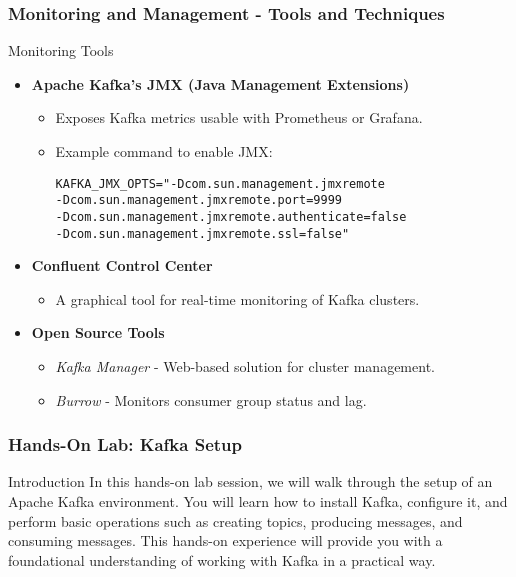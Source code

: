 \documentclass[aspectratio=169]{beamer}
\begin{document}
\begin{frame}[fragile]
  \frametitle{Monitoring and Management - Tools and Techniques}
  \begin{block}{Monitoring Tools}
    \begin{itemize}
      \item \textbf{Apache Kafka's JMX (Java Management Extensions)}
        \begin{itemize}
          \item Exposes Kafka metrics usable with Prometheus or Grafana.
          \item Example command to enable JMX:
          \begin{lstlisting}
KAFKA_JMX_OPTS="-Dcom.sun.management.jmxremote 
-Dcom.sun.management.jmxremote.port=9999
-Dcom.sun.management.jmxremote.authenticate=false
-Dcom.sun.management.jmxremote.ssl=false"
          \end{lstlisting}
        \end{itemize}

      \item \textbf{Confluent Control Center}
        \begin{itemize}
          \item A graphical tool for real-time monitoring of Kafka clusters.
        \end{itemize}
      
      \item \textbf{Open Source Tools}
        \begin{itemize}
          \item \textit{Kafka Manager} - Web-based solution for cluster management.
          \item \textit{Burrow} - Monitors consumer group status and lag.
        \end{itemize}
    \end{itemize}
  \end{block}
\end{frame}

\begin{frame}[fragile]
    \frametitle{Hands-On Lab: Kafka Setup}
    \begin{block}{Introduction}
        In this hands-on lab session, we will walk through the setup of an Apache Kafka environment. 
        You will learn how to install Kafka, configure it, and perform basic operations such as creating topics, producing messages, and consuming messages. 
        This hands-on experience will provide you with a foundational understanding of working with Kafka in a practical way.
    \end{block}
\end{frame}
\end{document}
